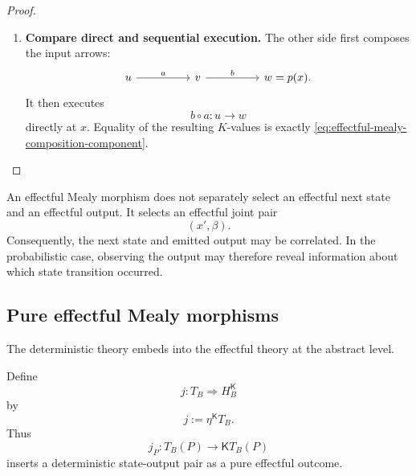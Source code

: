 \begin{proof}
\begin{enumerate}
        \item \textbf{Compare direct and sequential execution.}
        The other side first composes the input arrows:
        \[
            \begin{tikzcd}[column sep=huge]
                    u
                        \arrow[r, "a"]
                &
                    v
                        \arrow[r, "b"]
                &
                    w=p(x).
            \end{tikzcd}
        \]
        It then executes
        \[
            b\circ a:u\to w
        \]
        directly at \(x\). Equality of the resulting \(K\)-values is exactly
        \eqref{eq:effectful-mealy-composition-component}.
    \end{enumerate}
\end{proof}

\begin{remark}
\label{rem:effectful-correlated-state-output}
    An effectful Mealy morphism does not separately select an effectful next
    state and an effectful output. It selects an effectful joint pair
    \[
        (x',\beta).
    \]
    Consequently, the next state and emitted output may be correlated. In the
    probabilistic case, observing the output may therefore reveal information
    about which state transition occurred.
\end{remark}

\subsection{Pure effectful Mealy morphisms}
\label{subsec:pure-effectful-mealy-morphisms}

The deterministic theory embeds into the effectful theory at the abstract
level.

Define
\[
    j:
    T_B
    \Rightarrow
    H_B^{\mathsf K}
\]
by
\[
    j
    :=
    \eta^{\mathsf K}T_B.
\]
Thus
\[
    j_P:
    T_B(P)
    \longrightarrow
    \mathsf K T_B(P)
\]
inserts a deterministic state-output pair as a pure effectful outcome.

